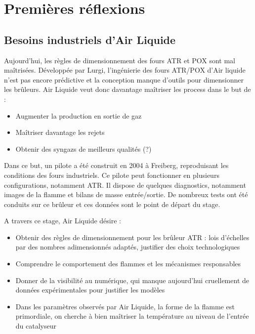 

\renewcommand\evenpagerightmark{{\scshape\small Internship overview}}
\renewcommand\oddpageleftmark{{\scshape\small Chapter 2}}

\renewcommand{\bibname}{References}

\hyphenation{}

\chapter[Premières réflexions]%
{Premières réflexions}
\label{premieres_reflexions}

\section{Besoins industriels d'Air Liquide}
Aujourd'hui, les règles de dimensionnement des fours ATR et POX sont mal maîtrisées. Développée par Lurgi, l'ingénierie des fours ATR/POX d'Air liquide n'est pas encore prédictive et la conception manque d'outils pour dimensionner les brûleurs. Air Liquide veut donc davantage maîtriser les process dans le but de :
\begin{itemize}
\item Augmenter la production en sortie de gaz
\item Maîtriser davantage les rejets
\item Obtenir des syngazs de meilleurs qualités (?)
\end{itemize}

Dans ce but, un pilote a été construit en 2004 à Freiberg, reproduisant les conditions des fours industriels. Ce pilote peut fonctionner en plusieurs configurations, notamment ATR. Il dispose de quelques diagnostics, notamment images de la flamme et bilans de masse entrée/sortie. De nombreux tests ont été conduits sur ce brûleur et ces données sont le point de départ du stage.

A travers ce stage, Air Liquide désire :
\begin{itemize}
\item Obtenir des règles de dimensionnement pour les brûleur ATR : lois d'échelles par des nombres adimensionnés adaptés, justifier des choix technologiques
\item Comprendre le comportement des flammes et les mécanismes responsables
\item Donner de la visibilité au numérique, qui manque aujourd'hui cruellement de données expérimentales pour justifier les modèles
\item Dans les paramètres observés par Air Liquide, la forme de la flamme est primordiale, on cherche à bien maîtriser la température au niveau de l'entrée du catalyseur
\end{itemize}

